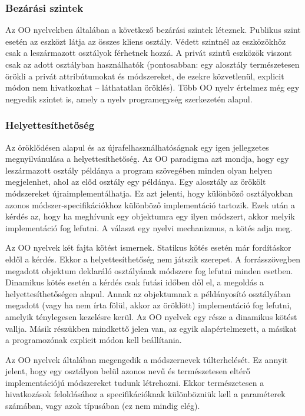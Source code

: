 \subsubsection{Bezárási szintek}
Az OO nyelvekben általában a következő bezárási szintek léteznek. Publikus szint esetén az eszközt látja az összes kliens osztály. Védett szintnél az eszközökhöz csak a leszármazott osztályok férhetnek hozzá. A privát szintű eszközök viszont csak az adott osztályban használhatók (pontosabban: egy alosztály természetesen örökli a privát attribútumokat és módszereket, de ezekre közvetlenül, explicit módon nem hivatkozhat – láthatatlan öröklés). Több OO nyelv értelmez még egy negyedik szintet is, amely a nyelv programegység szerkezetén alapul.

\subsubsection{Helyettesíthetőség}
Az öröklődésen alapul és az újrafelhasználhatóságnak egy igen jellegzetes megnyilvánulása a helyettesíthetőség. Az OO paradigma azt mondja, hogy egy leszármazott osztály példánya a program szövegében minden olyan helyen megjelenhet, ahol az előd osztály egy példánya. Egy alosztály az örökölt módszereket újraimplementálhatja. Ez azt jelenti, hogy különböző osztályokban azonos módszer-specifikációkhoz különböző implementáció tartozik. Ezek után a kérdés az, hogy ha meghívunk egy objektumra egy ilyen módszert, akkor melyik implementáció fog lefutni. A választ egy nyelvi mechanizmus, a kötés adja meg. 

Az OO nyelvek két fajta kötést ismernek. Statikus kötés esetén már fordításkor eldől a kérdés. Ekkor a helyettesíthetőség nem játszik szerepet. A forrásszövegben megadott objektum deklaráló osztályának módszere fog lefutni minden esetben. Dinamikus kötés esetén a kérdés csak futási időben dől el, a megoldás a helyettesíthetőségen alapul. Annak az objektumnak a példányosító osztályában megadott (vagy ha nem írta fölül, akkor az öröklött) implementáció fog lefutni, amelyik ténylegesen kezelésre kerül. Az OO nyelvek egy része a dinamikus kötést vallja. Másik részükben mindkettő jelen van, az egyik alapértelmezett, a másikat a programozónak explicit módon kell beállítania.

Az OO nyelvek általában megengedik a módszernevek túlterhelését. Ez annyit jelent, hogy egy osztályon belül azonos nevű és természetesen eltérő implementációjú módszereket tudunk létrehozni. Ekkor természetesen a hivatkozások feloldásához a specifikációknak különbözniük kell a paraméterek számában, vagy azok típusában (ez nem mindig elég).


